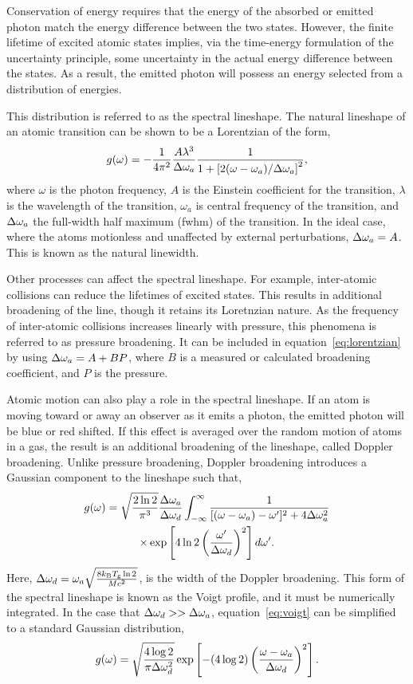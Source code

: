 Conservation of energy requires that the energy of the absorbed or emitted
photon match the energy difference between the two states. However, the finite
lifetime of excited atomic states implies, via the time-energy formulation of
the uncertainty principle, some uncertainty in the actual energy difference
between the states. As a result, the emitted photon will possess an energy
selected from a distribution of energies.

This distribution is referred to as the spectral lineshape. The natural
lineshape of an atomic transition can be shown \cite{Siegman1986} to be a
Lorentzian of the form,
\begin{equation}
  g(\omega) = -\frac{1}{4\pi^2}\frac{A\lambda^3}{\Delta \omega_a}
  \frac{1}{1 + \left[2(\omega-\omega_a)/\Delta \omega_a\right]^2},
  \label{eq:lorentzian}
\end{equation}
where $\omega$ is the photon frequency, $A$ is the Einstein coefficient for the
transition, $\lambda$ is the wavelength of the transition, $\omega_a$ is central
frequency of the transition, and $\Delta \omega_a$ the full-width half maximum (\acs{fwhm})
of the transition. In the ideal case, where the atoms motionless and unaffected
by external perturbations, $\Delta \omega_a = A$. This is known as the natural linewidth.

Other processes can affect the spectral lineshape. For example, inter-atomic
collisions can reduce the lifetimes of excited states. This results in
additional broadening of the line, though it retains its Loretnzian nature. As
the frequency of inter-atomic collisions increases linearly with pressure, this
phenomena is referred to as pressure broadening. It can be included in
equation~\ref{eq:lorentzian} by using $\Delta \omega_a = A + BP$, where $B$ is a measured
or calculated broadening coefficient, and $P$ is the pressure.

Atomic motion can also play a role in the spectral lineshape. If an atom is
moving toward or away an observer as it emits a photon, the emitted photon will
be blue or red shifted. If this effect is averaged over the random motion of
atoms in a gas, the result is an additional broadening of the lineshape, called
Doppler broadening. Unlike pressure broadening, Doppler broadening introduces a
Gaussian component to the lineshape such that,
\begin{multline}
  g(\omega) = \sqrt{\frac{2\ln{2}}{\pi^3}}\frac{\Delta \omega_a}{\Delta \omega_d}
  \int_{-\infty}^\infty
  \frac{1}{[(\omega - \omega_a) - \omega']^2 + 4\Delta \omega_a^2} \\
  \times \exp\left[4\ln{2}\left(\frac{\omega'}{\Delta \omega_d}\right)^2\right]d\omega'.
  \label{eq:voigt}
\end{multline}
Here, $\Delta \omega_d = \omega_a\sqrt{\frac{8k_\mathrm{B}T_\mathrm{g}\ln{2}} {Mc^2}}$, is
the width of the Doppler broadening. This form of the spectral lineshape is
known as the Voigt profile, and it must be numerically integrated. In the case
that $\Delta \omega_d >> \Delta \omega_a$, equation~\ref{eq:voigt} can be simplified to a standard
Gaussian distribution,
\begin{equation}
  g(\omega) = \sqrt{\frac{4\log{2}}{\pi\Delta \omega_d^2}}
  \exp\left[-(4\log{2})\left(\frac{\omega-\omega_a}{\Delta \omega_d}\right)^2\right].
\end{equation}

